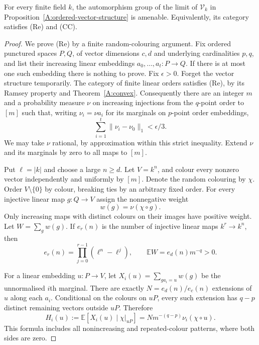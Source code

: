 \begin{theorem}
\label{A:ordered-vector-amenability}
For every finite field $k$, the automorphism group of the limit of
$\mathcal V_k$ in Proposition~\ref{A:ordered-vector-structure} is amenable.
Equivalently, its category satisfies (Re) and (CC).
\end{theorem}
\begin{proof}
We prove (Re) by a finite random-colouring argument. Fix ordered
punctured spaces $P,Q$, of vector dimensions $c,d$ and underlying
cardinalities $p,q$, and list their increasing linear embeddings
$a_0,\ldots,a_t:P\to Q$. If there is at most one such embedding there
is nothing to prove. Fix $\epsilon>0$. Forget the vector structure
temporarily. The category of finite linear orders satisfies (Re),
by its Ramsey property and Theorem~\ref{A:convex}. Consequently there
are an integer $m$ and a probability measure $\nu$ on increasing
injections from the $q$-point order to $[m]$ such that, writing
$\nu_i=\nu a_i$ for its marginals on $p$-point order embeddings,
\[
 \sum_{i=1}^t\|\nu_i-\nu_0\|_1<\epsilon/3.
\]
We may take $\nu$ rational, by approximation within this strict
inequality. Extend $\nu$ and its marginals by zero to all maps to
$[m]$.

Put $\ell=|k|$ and choose a large $n\geq d$. Let $V=k^n$, and colour
every nonzero vector independently and uniformly by $[m]$. Denote
the random colouring by $\chi$. Order $V\setminus\{0\}$ by colour,
breaking ties by an arbitrary fixed order. For every injective
linear map $g:Q\to V$ assign the nonnegative weight
\[
 w(g)=\nu(\chi\circ g).
\]
Only increasing maps with distinct colours on their images have
positive weight. Let $W=\sum_gw(g)$. If $e_r(n)$ is the number of
injective linear maps $k^r\to k^n$, then
\[
 e_r(n)=\prod_{j=0}^{r-1}(\ell^n-\ell^j),\qquad
 \mathbb E W=e_d(n)m^{-q}>0.
\]

For a linear embedding $u:P\to V$, let
$X_i(u)=\sum_{g a_i=u}w(g)$ be the unnormalised $i$th marginal.
There are exactly $N=e_d(n)/e_c(n)$ extensions of $u$ along each
$a_i$. Conditional on the colours on $uP$, every such extension has
$q-p$ distinct remaining vectors outside $uP$. Therefore
\[
 H_i(u):=\mathbb E[X_i(u)\mid\chi|_{uP}]
       =N m^{-(q-p)}\nu_i(\chi\circ u).
\]
This formula includes all nonincreasing and repeated-colour patterns,
where both sides are zero.


\end{proof}
